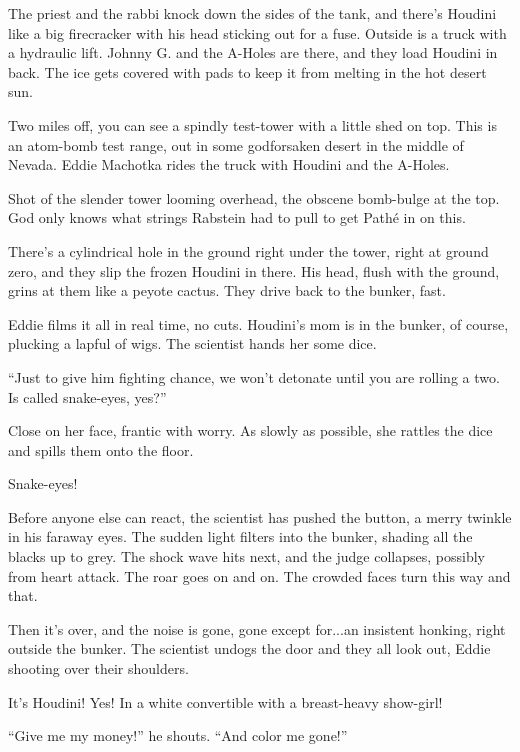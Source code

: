 The priest and the rabbi knock down the sides of the tank, and there's Houdini like a big firecracker with his head sticking out for a fuse. Outside is a truck with a hydraulic lift. Johnny G. and the A-Holes are there, and they load Houdini in back. The ice gets covered with pads to keep it from melting in the hot desert sun.

Two miles off, you can see a spindly test-tower with a little shed on top. This is an atom-bomb test range, out in some godforsaken desert in the middle of Nevada. Eddie Machotka rides the truck with Houdini and the A-Holes.

Shot of the slender tower looming overhead, the obscene bomb-bulge at the top. God only knows what strings Rabstein had to pull to get Pathé in on this.

There's a cylindrical hole in the ground right under the tower, right at ground zero, and they slip the frozen Houdini in there. His head, flush with the ground, grins at them like a peyote cactus. They drive back to the bunker, fast.

Eddie films it all in real time, no cuts. Houdini's mom is in the bunker, of course, plucking a lapful of wigs. The scientist hands her some dice.

``Just to give him fighting chance, we won't detonate until you are rolling a two. Is called snake-eyes, yes?''

Close on her face, frantic with worry. As slowly as possible, she rattles the dice and spills them onto the floor.

Snake-eyes!

Before anyone else can react, the scientist has pushed the button, a merry twinkle in his faraway eyes. The sudden light filters into the bunker, shading all the blacks up to grey. The shock wave hits next, and the judge collapses, possibly from heart attack. The roar goes on and on. The crowded faces turn this way and that.

Then it's over, and the noise is gone, gone except for...an insistent honking, right outside the bunker. The scientist undogs the door and they all look out, Eddie shooting over their shoulders.

It's Houdini! Yes! In a white convertible with a breast-heavy show-girl!

``Give me my money!'' he shouts. ``And color me gone!''